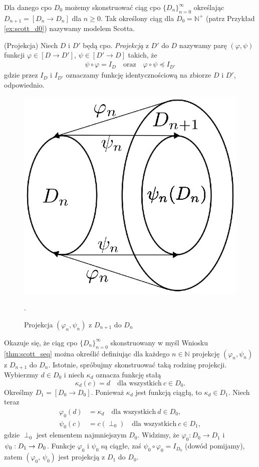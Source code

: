   \begin{definicja}\label{thm:scott_seq}
    Dla danego cpo \(D_0\) możemy skonstruować ciąg cpo \(\{D_n\}_{n=0}^{\infty}\) określając \(D_{n+1}=[D_n\to D_n]\) dla \(n\geq 0\). Tak określony ciąg dla \(D_0=\mathbb{N}^{+}\) (patrz Przykład \ref{ex:scott_d0}) nazywamy modelem Scotta.
  \end{definicja}
\begin{definicja}(Projekcja) %
Niech \(D\) i \(D'\) będą cpo. \emph{Projekcją} z \(D'\) do \(D\) nazywamy parę \((\varphi, \psi)\) funkcji \(\varphi \in [D\to D']\), \(\psi \in [D'\to D]\) takich, że
\begin{align}
\psi\circ \varphi = I_D\quad \text{oraz}\quad \varphi\circ \psi \preceq I_{D'} %
\end{align}
gdzie przez \(I_D\) i \(I_{D'}\) oznaczamy funkcję identycznościową na zbiorze \(D\) i \(D'\), odpowiednio.
\end{definicja}

\begin{figure}[h]
  \centering
\includegraphics[width=0.37\linewidth]{../embeding_i}
  \caption{Projekcja \((\varphi_n,\psi_n)\) z \(D_{n+1}\) do \(D_n\)}.\label{fig:projection}
\end{figure}

  Okazuje się, że ciąg cpo \(\{D_n\}_{n=0}^\infty\) skonstruowany w myśl Wniosku \ref{thm:scott_seq} można określić definiując dla każdego \(n\in\mathbb{N}\) projekcję \((\varphi_n,\psi_n)\) z \(D_{n+1}\) do \(D_n\). Istotnie, spróbujmy skonstruować taką rodzinę projekcji. Wybierzmy \(d\in D_0\) i niech \(\kappa_d\) oznacza funkcję stałą 
  \[\kappa_d(c)=d\quad \text{dla wszystkich}\ c\in D_0.\]
  Określmy \(D_1=[D_0\to D_0]\). Ponieważ \(\kappa_d\) jest funkcją ciągłą, to \(\kappa_d\in D_1\). Niech teraz
  \begin{align*}
    \varphi_0 (d) &= \kappa_d  \quad \text{dla wszystkich}\ d\in D_0,\\
    \psi_0(c) &= c(\perp_0) \quad \text{dla wszystkich}\ c\in D_1,
  \end{align*}
gdzie \(\perp_0\) jest elementem najmniejszym \(D_0\). Widzimy, że \(\varphi_0: D_0 \to D_1\) i \(\psi_0:\nobreak D_1\to\nobreak D_0\). Funkcje \(\varphi_0\) i \(\psi_0\) są ciągłe, zaś \(\psi_0\circ\varphi_0 = I_{D_0}\) (dowód pomijamy), zatem \((\varphi_0,\,\psi_0)\) jest projekcją z \(D_1\) do \(D_0\).

